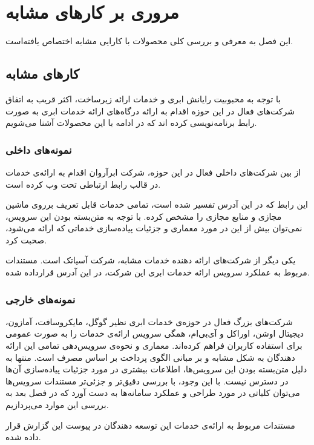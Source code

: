 \chapter{مروری بر کارهای مشابه}
 این فصل به معرفی و بررسی کلی محصولات با کارایی مشابه اختصاص یافته‌است.

\section{کارهای مشابه}
با توجه به محبوبیت رایانش ابری و خدمات ارائه زیرساخت، اکثر قریب به اتفاق شرکت‌های فعال در این حوزه اقدام به ارائه درگاه‌های ارائه خدمات ابری به صورت رابط برنامه‌نویسی کرده اند که در ادامه با این محصولات آشنا می‌شویم.

\subsection{نمونه‌های داخلی}
از بین شرکت‌های داخلی فعال در این حوزه، شرکت ابرآروان اقدام به ارائه‌ی خدمات  در قالب رابط ارتباطی تحت وب کرده است.

این رابط که در این آدرس تفسیر شده است، تمامی خدمات قابل تعریف برروی ماشین مجازی و منابع مجازی را مشخص کرده. با توجه به متن‌بسته بودن این سرویس، نمی‌توان بیش از این در مورد معماری و جزئیات پیاده‌سازی خدماتی که ارائه می‌شود، صحبت کرد.


یکی دیگر از شرکت‌های ارائه دهنده خدمات مشابه، شرکت آسیاتک است. مستندات مربوط به عملکرد سرویس ارائه خدمات ابری این شرکت، در این آدرس قرارداده شده.


\subsection{نمونه‌های خارجی}
شرکت‌های بزرگ فعال در حوزه‌ی خدمات ابری نظیر گوگل، مایکروسافت، آمازون، دیجیتال اوشن، اوراکل و آی‌بی‌ام، همگی سرویس ارائه‌ی خدمات  را به صورت عمومی برای استفاده کاربران فراهم کرده‌اند. معماری و نحوه‌ی سرویس‌دهی تمامی این ارائه دهندگان به شکل مشابه و بر مبانی الگوی پرداخت بر اساس مصرف است. منتها به دلیل متن‌بسته بودن این سرویس‌ها، اطلاعات بیشتری در مورد جزئیات پیاده‌سازی آن‌ها در دسترس نیست. با این وجود، با بررسی دقیق‌تر و جزئی‌تر مستندات سرویس‌ها می‌توان کلیاتی در مورد طراحی و عملکرد سامانه‌ها به دست آورد که در فصل بعد به بررسی این موارد می‌پردازیم.

مستندات مربوط به ارائه‌ی خدمات  این توسعه دهندگان در پیوست این گزارش قرار داده شده.